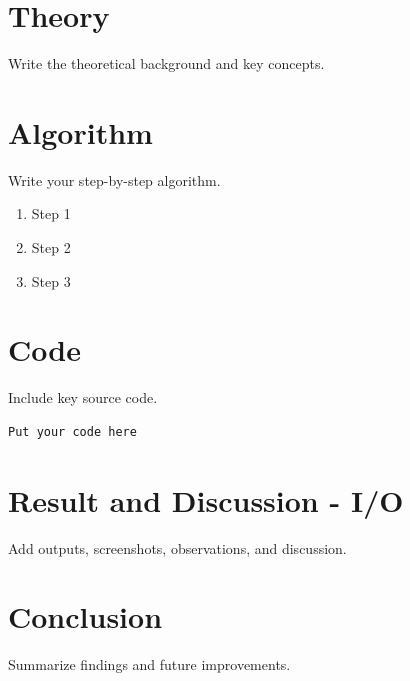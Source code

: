 
\section{Theory}
Write the theoretical background and key concepts.

\section{Algorithm}
Write your step-by-step algorithm.
\begin{enumerate}
  \item Step 1
  \item Step 2
  \item Step 3
\end{enumerate}

\section{Code}
Include key source code.
\begin{verbatim}
Put your code here
\end{verbatim}

\section{Result and Discussion - I/O}
Add outputs, screenshots, observations, and discussion.

\section{Conclusion}
Summarize findings and future improvements.

